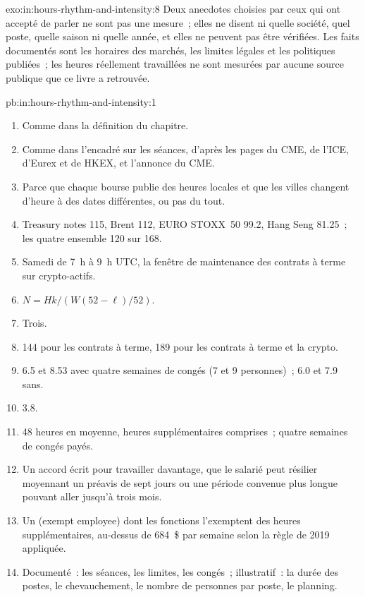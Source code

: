 \begin{solution}{exo:in:hours-rhythm-and-intensity:8}
Deux anecdotes choisies par ceux qui ont accepté de parler ne sont pas une mesure~; elles ne disent ni quelle société, quel poste, quelle saison ni quelle année, et
elles ne peuvent pas être vérifiées. Les faits documentés sont les horaires des marchés, les limites légales et les politiques publiées~; les heures
réellement travaillées ne sont mesurées par aucune source publique que ce livre a retrouvée.
\end{solution}

\begin{solution}{pb:in:hours-rhythm-and-intensity:1}
\begin{enumerate}
\item Comme dans la définition du chapitre.
\item Comme dans l'encadré sur les séances, d'après les pages du CME, de l'ICE, d'Eurex et de HKEX, et l'annonce du CME.
\item Parce que chaque bourse publie des heures locales et que les villes changent d'heure à des dates différentes, ou pas du tout.
\item Treasury notes 115, Brent 112, EURO STOXX~50 99.2, Hang Seng 81.25~; les quatre ensemble 120 sur 168.
\item Samedi de 7~h à 9~h UTC, la fenêtre de maintenance des contrats à terme sur crypto-actifs.
\item $N=Hk/(W(52-\ell)/52)$.
\item Trois.
\item 144 pour les contrats à terme, 189 pour les contrats à terme et la crypto.
\item 6.5 et 8.53 avec quatre semaines de congés (7 et 9 personnes)~; 6.0 et 7.9 sans.
\item 3.8.
\item 48 heures en moyenne, heures supplémentaires comprises~; quatre semaines de congés payés.
\item Un accord écrit pour travailler davantage, que le salarié peut résilier moyennant un préavis de sept jours ou une période convenue plus longue pouvant aller jusqu'à
trois mois.
\item Un  (exempt employee) dont les fonctions l'exemptent des heures supplémentaires, au-dessus de 684~\$ par semaine selon la règle de 2019 appliquée.
\item Documenté~: les séances, les limites, les congés~; illustratif~: la durée des postes, le chevauchement, le nombre de personnes par poste, le planning.

\end{enumerate}
\end{solution}
